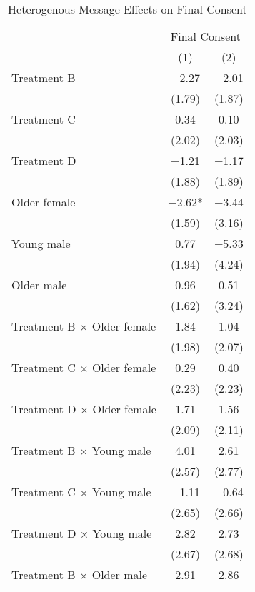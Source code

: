 \documentclass[12pt, a4paper]{article}
\begin{document}
\begin{table}[H]

\caption{\label{tab:consent-lm-interaction-reg}Heterogenous Message Effects on Final Consent}
\centering
\fontsize{8}{10}\selectfont
\begin{threeparttable}
\begin{tabular}[t]{lcc}
\toprule
\multicolumn{1}{c}{ } & \multicolumn{2}{c}{Final Consent} \\
\cmidrule(l{3pt}r{3pt}){2-3}
  & (1) & (2)\\
\midrule
Treatment B & \num{-2.27} & \num{-2.01}\\
 & (\num{1.79}) & (\num{1.87})\\
Treatment C & \num{0.34} & \num{0.10}\\
 & (\num{2.02}) & (\num{2.03})\\
Treatment D & \num{-1.21} & \num{-1.17}\\
 & (\num{1.88}) & (\num{1.89})\\
Older female & \num{-2.62}* & \num{-3.44}\\
 & (\num{1.59}) & (\num{3.16})\\
Young male & \num{0.77} & \num{-5.33}\\
 & (\num{1.94}) & (\num{4.24})\\
Older male & \num{0.96} & \num{0.51}\\
 & (\num{1.62}) & (\num{3.24})\\
Treatment B $\times$ Older female & \num{1.84} & \num{1.04}\\
 & (\num{1.98}) & (\num{2.07})\\
Treatment C $\times$ Older female & \num{0.29} & \num{0.40}\\
 & (\num{2.23}) & (\num{2.23})\\
Treatment D $\times$ Older female & \num{1.71} & \num{1.56}\\
 & (\num{2.09}) & (\num{2.11})\\
Treatment B $\times$ Young male & \num{4.01} & \num{2.61}\\
 & (\num{2.57}) & (\num{2.77})\\
Treatment C $\times$ Young male & \num{-1.11} & \num{-0.64}\\
 & (\num{2.65}) & (\num{2.66})\\
Treatment D $\times$ Young male & \num{2.82} & \num{2.73}\\
 & (\num{2.67}) & (\num{2.68})\\
Treatment B $\times$ Older male & \num{2.91} & \num{2.86}\\

\end{tabular}
\end{threeparttable}
\end{table}
\end{document}
